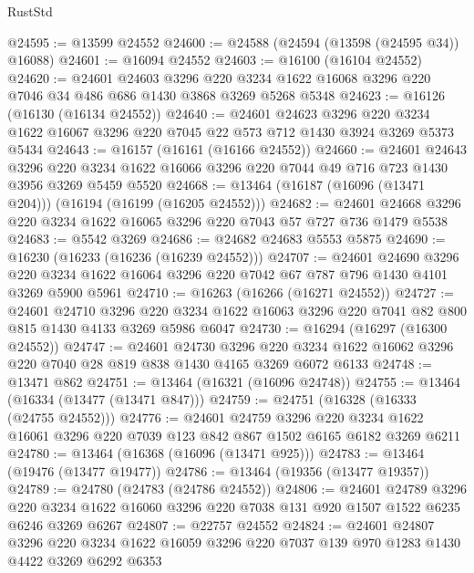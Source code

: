 \begin{lexlean}{RustStd}
\begin{coremodule}
@24595 := @13599 @24552
@24600 := @24588 (@24594 (@13598 (@24595 @34)) @16088)
@24601 := @16094 @24552
@24603 := @16100 (@16104 @24552)
@24620 := @24601
    @24603
    @3296
    @220
    @3234
    @1622
    @16068
    @3296
    @220
    @7046
    @34
    @486
    @686
    @1430
    @3868
    @3269
    @5268
    @5348
@24623 := @16126 (@16130 (@16134 @24552))
@24640 := @24601
    @24623
    @3296
    @220
    @3234
    @1622
    @16067
    @3296
    @220
    @7045
    @22
    @573
    @712
    @1430
    @3924
    @3269
    @5373
    @5434
@24643 := @16157 (@16161 (@16166 @24552))
@24660 := @24601
    @24643
    @3296
    @220
    @3234
    @1622
    @16066
    @3296
    @220
    @7044
    @49
    @716
    @723
    @1430
    @3956
    @3269
    @5459
    @5520
@24668 := @13464 (@16187 (@16096 (@13471 @204))) (@16194 (@16199 (@16205 @24552)))
@24682 := @24601 @24668 @3296 @220 @3234 @1622 @16065 @3296 @220 @7043 @57 @727 @736 @1479 @5538
@24683 := @5542 @3269
@24686 := @24682 @24683 @5553 @5875
@24690 := @16230 (@16233 (@16236 (@16239 @24552)))
@24707 := @24601
    @24690
    @3296
    @220
    @3234
    @1622
    @16064
    @3296
    @220
    @7042
    @67
    @787
    @796
    @1430
    @4101
    @3269
    @5900
    @5961
@24710 := @16263 (@16266 (@16271 @24552))
@24727 := @24601
    @24710
    @3296
    @220
    @3234
    @1622
    @16063
    @3296
    @220
    @7041
    @82
    @800
    @815
    @1430
    @4133
    @3269
    @5986
    @6047
@24730 := @16294 (@16297 (@16300 @24552))
@24747 := @24601
    @24730
    @3296
    @220
    @3234
    @1622
    @16062
    @3296
    @220
    @7040
    @28
    @819
    @838
    @1430
    @4165
    @3269
    @6072
    @6133
@24748 := @13471 @862
@24751 := @13464 (@16321 (@16096 @24748))
@24755 := @13464 (@16334 (@13477 (@13471 @847)))
@24759 := @24751 (@16328 (@16333 (@24755 @24552)))
@24776 := @24601
    @24759
    @3296
    @220
    @3234
    @1622
    @16061
    @3296
    @220
    @7039
    @123
    @842
    @867
    @1502
    @6165
    @6182
    @3269
    @6211
@24780 := @13464 (@16368 (@16096 (@13471 @925)))
@24783 := @13464 (@19476 (@13477 @19477))
@24786 := @13464 (@19356 (@13477 @19357))
@24789 := @24780 (@24783 (@24786 @24552))
@24806 := @24601
    @24789
    @3296
    @220
    @3234
    @1622
    @16060
    @3296
    @220
    @7038
    @131
    @920
    @1507
    @1522
    @6235
    @6246
    @3269
    @6267
@24807 := @22757 @24552
@24824 := @24601
    @24807
    @3296
    @220
    @3234
    @1622
    @16059
    @3296
    @220
    @7037
    @139
    @970
    @1283
    @1430
    @4422
    @3269
    @6292
    @6353

\end{coremodule}
\end{lexlean}
